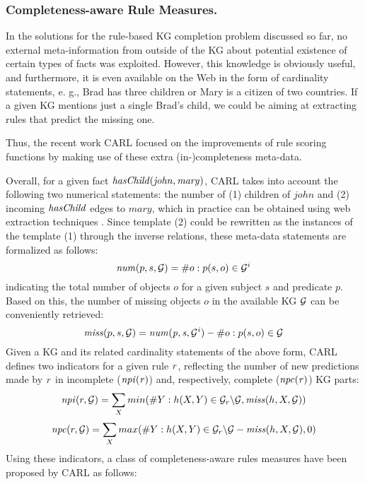 \subsubsection{Completeness-aware Rule Measures.}  
In the solutions for the rule-based KG completion problem discussed so far, no external meta-information from outside of the KG about potential existence of certain types of facts was exploited. However, this knowledge is obviously useful, and furthermore, it is even available on the Web
in the form of cardinality statements, e. g., Brad has three children or Mary is a citizen of two countries. If a given KG mentions just a single Brad's child, we could be aiming at extracting rules that predict the missing
one.

Thus, the recent work CARL \cite{carl} focused on the improvements of rule scoring functions by making use of these extra (in-)completeness meta-data.

Overall, for a given fact $\mathit{hasChild(john,  mary)}$, CARL takes into account the following two numerical statements: the number of (1) children of $john$ and (2) incoming $\mathit{hasChild}$ edges to $mary$, which in practice can be obtained using web extraction techniques \cite{cardinality-extraction-iswc-2016}. Since template (2) could be rewritten as the instances of the template (1) through the inverse relations, these meta-data statements are formalized as follows:
\[\mathit{num}(p,s, \mathcal{G}) = \# o : p(s,o) \in \mathcal{G}^i\]
indicating the total number of objects $o$ for a given subject $s$ and predicate $p$. Based on this, the number of missing objects $o$ in the available KG $\mathcal{G}$ can be conveniently  retrieved:
\[\mathit{miss}(p,s,\mathcal{G}) = \mathit{num(p,s,\mathcal{G}^i)} - \#o : p(s,o) \in \mathcal{G}\]
Given a KG and its related cardinality statements of the above form, CARL defines two indicators for a given rule $\mathit{r}$, reflecting the number of new 
predictions made by $\mathit{r}$ in incomplete ($\mathit{npi(r)}$) and, respectively, complete ($\mathit{npc(r)}$) KG parts:
\begin{align*}
\mathit{npi}(r, \mathcal{G}) = \sum_X min(\#Y: h(X,Y)\in \mathcal{G}_r\backslash \mathcal{G}, \mathit{miss}(h,X,\mathcal{G}))
\end{align*}
\vspace{-\topsep}
\vspace{-\topsep}
\begin{align*}
\mathit{npc}(r, \mathcal{G}) = \sum_X max(\#Y: h(X,Y)\in\mathcal{G}_r\backslash \mathcal{G} - \mathit{miss}(h,X,\mathcal{G}), 0)
\end{align*}
Using these indicators, a class of completeness-aware rules measures have been proposed by CARL as follows:
% 

